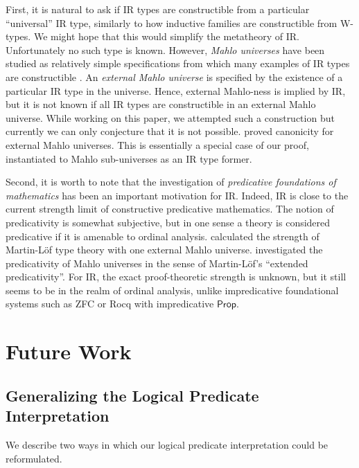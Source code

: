 \documentclass[acmsmall,screen,review]{acmart}
\newcommand{\msf}[1]{{\mathsf{#1}}}
\begin{document}
First, it is natural to ask if IR types are constructible from a particular ``universal'' IR type,
similarly to how inductive families are constructible from W-types. We might hope that this would
simplify the metatheory of IR. Unfortunately no such type is known. However, \emph{Mahlo universes}
have been studied as relatively simple specifications from which many examples of IR types
are constructible \cite{setzer00mahlo}. An \emph{external Mahlo universe} is specified by the
existence of a particular IR type in the universe. Hence, external Mahlo-ness is implied by IR, but
it is not known if all IR types are constructible in an external Mahlo universe. While working on
this paper, we attempted such a construction but currently we can only conjecture that it is not
possible. \citet{mahlo-canonicity} proved canonicity for external Mahlo universes. This is
essentially a special case of our proof, instantiated to Mahlo sub-universes as an IR type former.

Second, it is worth to note that the investigation of \emph{predicative foundations of mathematics}
has been an important motivation for IR. Indeed, IR is close to the current strength limit of
constructive predicative mathematics. The notion of predicativity is somewhat
subjective, but in one sense a theory is considered predicative if it is amenable to ordinal
analysis. \citet{setzer00mahlo} calculated the strength of Martin-Löf type theory with one external
Mahlo universe. \citet{DBLP:journals/logcom/DybjerS24} investigated the predicativity of Mahlo
universes in the sense of Martin-Löf's ``extended predicativity''. For IR, the exact proof-theoretic
strength is unknown, but it still seems to be in the realm of ordinal analysis, unlike
impredicative foundational systems such as ZFC or Rocq with impredicative $\msf{Prop}$.

\section{Future Work}\label{sec:future-work}

\subsection{Generalizing the Logical Predicate Interpretation} \label{sec:generalizing-the-logical-predicate}

We describe two ways in which our logical predicate interpretation could be reformulated.
\end{document}
